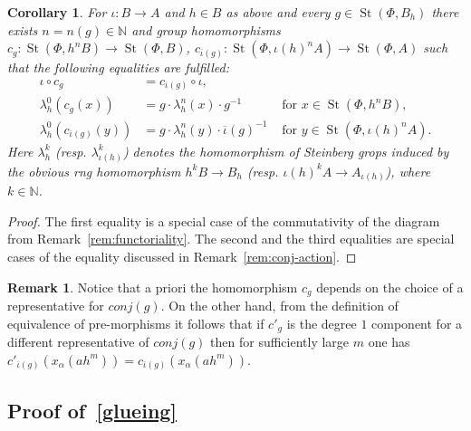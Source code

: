 \documentclass[oneside, 11pt]{amsart} \pdfoutput=1
\newcommand{\K}{{\mathrm{K}}}
\newcommand{\St}{\mathop{\mathrm{St}}\nolimits}
\numberwithin{equation}{section}
\newtheorem{corollary}[lemma]{Corollary}
\theoremstyle{definition}
\newtheorem{rem}[lemma]{Remark}
\begin{document}
\begin{corollary}
\label{vorcor}
For $\iota \colon B \to A$ and $h \in B$ as above and every $g \in \St(\Phi, B_h)$ there exists $n = n(g) \in \mathbb{N}$ 
and group homomorphisms $c_g \colon \St(\Phi, h^nB) \to \St(\Phi, B)$, $c_{\overline{\iota}(g)} \colon \St(\Phi, \iota(h)^nA) \to \St(\Phi, A)$
such that the following equalities are fulfilled:
\begin{align}
 \label{eq:coherence} \iota \circ c_g &= c_{\overline{\iota}(g)} \circ \iota, &\\
 \label{eq:strictB} \lambda_h^0 (c_g (x)) &= g \cdot \lambda_h^n(x) \cdot g^{-1}&\text{ for }x \in \St(\Phi, h^nB),\\
 \label{eq:strictA} \lambda_h^0 (c_{\overline{\iota}(g)}(y)) &= g \cdot \lambda_h^n(y) \cdot \overline{\iota}(g)^{-1}&\text{ for }y \in \St(\Phi, \iota(h)^nA).
\end{align}
Here $\lambda_h^k$ (resp. $\lambda^k_{\iota(h)}$) denotes the homomorphism of Steinberg grops induced by the obvious rng homomorphism $h^kB \to B_h$ (resp. $\iota(h)^kA \to A_{\iota(h)}$), where $k \in \mathbb{N}$.
\end{corollary}
\begin{proof}
 The first equality is a special case of the commutativity of the diagram from Remark~\ref{rem:functoriality}.
 The second and the third equalities are special cases of the equality discussed in Remark~\ref{rem:conj-action}.
\end{proof}
\begin{rem}\label{rem:indendepence}
 Notice that a priori the homomorphism $c_g$ depends on the choice of a representative for $conj(g)$. On the other hand, from the definition of equivalence of pre-morphisms it follows that if $c'_g$ is the degree $1$ component for a different representative of $conj(g)$ then for sufficiently large $m$ one has $c'_{\overline{\iota}(g)}(x_{\alpha}(ah^m)) = c_{\overline{\iota}(g)}(x_{\alpha}(ah^m))$.
\end{rem}

\subsection{Proof of~\cref{glueing}}
\end{document}
